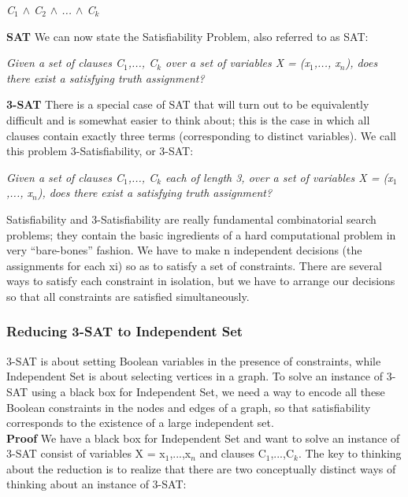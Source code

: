 \documentclass{article}
\begin{document}
\begin{center}
    \emph{C$_1$ $\wedge$ C$_2$ $\wedge$ ... $\wedge$ C$_k$}
\end{center}

\textbf{SAT} We can now state the Satisfiability Problem, also referred to as SAT: \\

\begin{center}
    \emph{Given a set of clauses C$_1$,..., C$_k$ over a set of variables X = (x$_1$,..., x$_n$), does there exist a satisfying truth assignment?}
\end{center}

\textbf{3-SAT} There is a special case of SAT that will turn out to be equivalently difficult and is somewhat easier to think about; this is the case in which all clauses contain exactly three terms (corresponding to distinct variables). We call this problem 3-Satisfiability, or 3-SAT:\\

\begin{center}
    \emph{Given a set of clauses C$_1$,..., C$_k$ each of length 3, over a set of variables X = (x$_1$,..., x$_n$), does there exist a satisfying truth assignment?}
\end{center}

Satisfiability and 3-Satisfiability are really fundamental combinatorial search problems; they contain the basic ingredients of a hard computational problem in very “bare-bones” fashion. We have to make n independent decisions (the assignments for each xi) so as to satisfy a set of constraints. There are several ways to satisfy each constraint in isolation, but we have to arrange our decisions so that all constraints are satisfied simultaneously.\\

\subsubsection{Reducing 3-SAT to Independent Set}
3-SAT is about setting Boolean variables in the presence of constraints, while Independent Set is about selecting vertices in a graph. To solve an instance of 3-SAT using a black box for Independent Set, we need a way to encode all these Boolean constraints in the nodes and edges of a graph, so that satisfiability corresponds to the existence of a large independent set.\\

\textbf{Proof} We have a black box for Independent Set and want to solve an instance of 3-SAT consist of variables X = {x$_1$,...,x$_n$} and clauses C$_1$,...,C$_k$. The key to thinking about the reduction is to realize that there are two conceptually distinct ways of thinking about an instance of 3-SAT:\\
\end{document}

